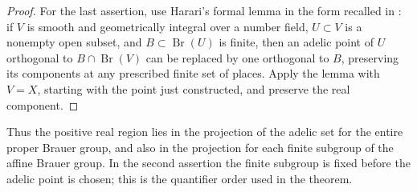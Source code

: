 \begin{proof}
For the last assertion, use Harari's formal lemma in the form
recalled in \cite{colliothelene_skoro2021}: if $V$ is smooth and
geometrically integral over a number field, $U\subset V$ is a
nonempty open subset, and $B\subset\operatorname{Br}(U)$ is finite,
then an adelic point of $U$ orthogonal to
$B\cap\operatorname{Br}(V)$ can be replaced by one orthogonal to
$B$, preserving its components at any prescribed finite set of
places.  Apply the lemma with $V=X$, starting with the point just
constructed, and preserve the real component.
\end{proof}

Thus the positive real region lies in the projection of the adelic
set for the entire proper Brauer group, and also in the projection
for each finite subgroup of the affine Brauer group.  In the second
assertion the finite subgroup is fixed before the adelic point is
chosen; this is the quantifier order used in the theorem.
